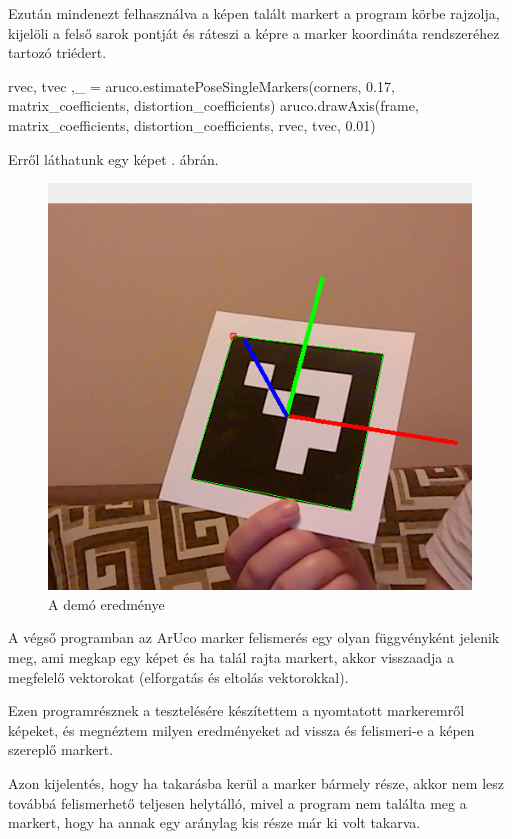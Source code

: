 Ezután  mindenezt felhasználva a képen talált markert a program  körbe rajzolja, kijelöli a felső sarok pontját és ráteszi a képre a marker koordináta rendszeréhez tartozó triédert.
\begin{python}
rvec, tvec ,_ = aruco.estimatePoseSingleMarkers(corners,
0.17, matrix_coefficients, distortion_coefficients)
aruco.drawAxis(frame, matrix_coefficients, distortion_coefficients,
rvec, tvec, 0.01)
\end{python}
Erről láthatunk egy képet . ábrán.
\begin{figure}[htp]
    \centering
   	\includegraphics[width=4truecm, height=2.8truecm]{images/felismeres_aruco.png}
	\caption{A demó eredménye}
	\label{fig:felismeres_aruco}
\end{figure}


A végső programban az ArUco marker felismerés egy olyan függvényként jelenik meg, ami megkap egy képet és ha talál rajta markert, akkor visszaadja a megfelelő vektorokat (elforgatás és eltolás vektorokkal).

Ezen programrésznek a tesztelésére készítettem a nyomtatott markeremről képeket, és megnéztem milyen eredményeket ad vissza és felismeri-e a képen szereplő markert.

Azon kijelentés, hogy ha takarásba kerül a marker bármely része, akkor nem lesz továbbá felismerhető teljesen helytálló, mivel a program nem találta meg a markert, hogy ha annak egy aránylag kis része már ki volt takarva.


